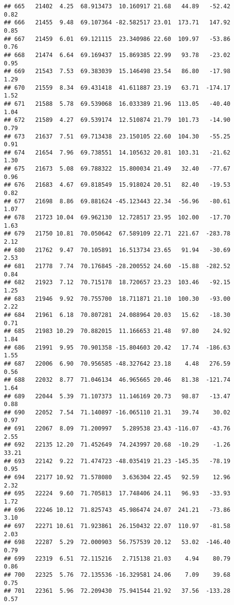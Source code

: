 \documentclass[]{article}
\begin{document}
\begin{verbatim}
## 665   21402  4.25  68.913473  10.160917 21.68   44.89   -52.42  0.82
## 666   21455  9.48  69.107364 -82.582517 23.01  173.71   147.92  0.85
## 667   21459  6.01  69.121115  23.340986 22.60  109.97   -53.86  0.76
## 668   21474  6.64  69.169437  15.869385 22.99   93.78   -23.02  0.95
## 669   21543  7.53  69.383039  15.146498 23.54   86.80   -17.98  1.29
## 670   21559  8.34  69.431418  41.611887 23.19   63.71  -174.17  1.52
## 671   21588  5.78  69.539068  16.033389 21.96  113.05   -40.40  1.04
## 672   21589  4.27  69.539174  12.510874 21.79  101.73   -14.90  0.79
## 673   21637  7.51  69.713438  23.150105 22.60  104.30   -55.25  0.91
## 674   21654  7.96  69.738551  14.105632 20.81  103.31   -21.62  1.30
## 675   21673  5.08  69.788322  15.800034 21.49   32.40   -77.67  0.96
## 676   21683  4.67  69.818549  15.918024 20.51   82.40   -19.53  0.82
## 677   21698  8.86  69.881624 -45.123443 22.34  -56.96   -80.61  1.07
## 678   21723 10.04  69.962130  12.728517 23.95  102.00   -17.70  1.63
## 679   21750 10.81  70.050642  67.589109 22.71  221.67  -283.78  2.12
## 680   21762  9.47  70.105891  16.513734 23.65   91.94   -30.69  2.53
## 681   21778  7.74  70.176845 -28.200552 24.60  -15.88  -282.52  0.84
## 682   21923  7.12  70.715178  18.720657 23.23  103.46   -92.15  1.25
## 683   21946  9.92  70.755700  18.711871 21.10  100.30   -93.00  2.22
## 684   21961  6.18  70.807281  24.088964 20.03   15.62   -18.30  0.71
## 685   21983 10.29  70.882015  11.166653 21.48   97.80    24.92  1.84
## 686   21991  9.95  70.901358 -15.804603 20.42   17.74  -186.63  1.55
## 687   22006  6.90  70.956585 -48.327642 23.18    4.48   276.59  0.56
## 688   22032  8.77  71.046134  46.965665 20.46   81.38  -121.74  1.64
## 689   22044  5.39  71.107373  11.146169 20.73   98.87   -13.47  0.88
## 690   22052  7.54  71.140897 -16.065110 21.31   39.74    30.02  0.97
## 691   22067  8.09  71.200997   5.289538 23.43 -116.07   -43.76  2.55
## 692   22135 12.20  71.452649  74.243997 20.68  -10.29    -1.26 33.21
## 693   22142  9.22  71.474723 -48.035419 21.23 -145.35   -78.19  0.95
## 694   22177 10.92  71.578080   3.636304 22.45   92.59    12.96  2.32
## 695   22224  9.60  71.705813  17.748406 24.11   96.93   -33.93  1.72
## 696   22246 10.12  71.825743  45.986474 24.07  241.21   -73.86  3.10
## 697   22271 10.61  71.923861  26.150432 22.07  110.97   -81.58  2.03
## 698   22287  5.29  72.000903  56.757539 20.12   53.02  -146.40  0.79
## 699   22319  6.51  72.115216   2.715138 21.03    4.94    80.79  0.86
## 700   22325  5.76  72.135536 -16.329581 24.06    7.09    39.68  0.75
## 701   22361  5.96  72.209430  75.941544 21.92   37.56  -133.28  0.57

\end{verbatim}
\end{document}
